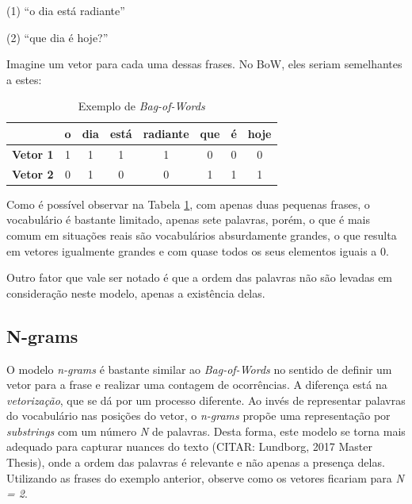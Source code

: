 \begin{samepage}
(1) “o dia está radiante”

\nopagebreak

(2) “que dia é hoje?”
\end{samepage}

Imagine um vetor para cada uma dessas frases. No BoW, eles seriam semelhantes a estes:

\begin{center}
\begin{table}[htbp]
\centering
\begin{tabular}{c|ccccccc}
 & \textbf{o} & \textbf{dia} & \textbf{está} & \textbf{radiante} & \textbf{que} & \textbf{é} & \textbf{hoje} \\ \hline
\textbf{Vetor 1} & 1 & 1 & 1 & 1 & 0 & 0 & 0 \\
\textbf{Vetor 2} & 0 & 1 & 0 & 0 & 1 & 1 & 1 
\end{tabular}
\caption{Exemplo de \textit{Bag-of-Words}}
\label{bow}
\end{table}
\end{center}

Como é possível observar na Tabela \ref{bow}, com apenas duas pequenas frases, o vocabulário é bastante limitado, apenas sete palavras, porém, o que é mais comum em situações reais são vocabulários absurdamente grandes, o que resulta em vetores igualmente grandes e com quase todos os seus elementos iguais a 0.

Outro fator que vale ser notado é que a ordem das palavras não são levadas em consideração neste modelo, apenas a existência delas.

\subsection{N-grams}

O modelo \textit{n-grams} é bastante similar ao \textit{Bag-of-Words} no sentido de definir um vetor para a frase e realizar uma contagem de ocorrências. A diferença está na \textit{vetorização}, que se dá por um processo diferente. Ao invés de representar palavras do vocabulário nas posições do vetor, o \textit{n-grams} propõe uma representação por \textit{substrings}  com um número \textit{N} de palavras. Desta forma, este modelo se torna mais adequado para capturar nuances do texto (CITAR: Lundborg, 2017 Master Thesis), onde a ordem das palavras é relevante e não apenas a presença delas. Utilizando as frases do exemplo anterior, observe como os vetores ficariam para \textit{N = 2}.

